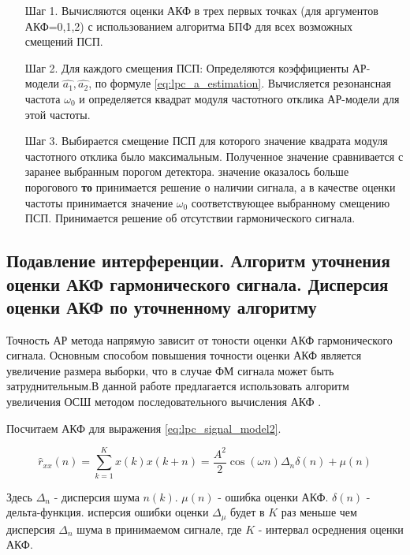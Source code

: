 \begin{itemize}
\item[Шаг 1.] Вычисляются оценки  АКФ в трех первых точках (для аргументов АКФ=0,1,2)
	с использованием алгоритма БПФ для всех возможных смещений ПСП. 
\item[Шаг 2.] Для каждого смещения ПСП: 
	Определяются коэффициенты АР-модели ${\hat{a_1}, \hat{a_2}}$, 
	по формуле \ref{eq:lpc_a_estimation}. 
	Вычисляется резонансная частота ${\omega_0}$
	и определяется квадрат модуля частотного отклика АР-модели для этой частоты. 
\item[Шаг 3.] Выбирается смещение ПСП для которого значение квадрата модуля частотного отклика было максимальным. Полученное значение сравнивается с заранее выбранным порогом детектора. 
	  значение оказалось больше порогового {\bf{то}} 
		принимается решение о наличии сигнала, а в качестве оценки
		частоты принимается значение ${\omega_0}$ соответствующее выбранному смещению ПСП. 
		Принимается решение об отсутствии гармонического сигнала.
\end{itemize}

\subsection{Подавление интерференции. Алгоритм уточнения оценки АКФ гармонического сигнала.
		Дисперсия оценки АКФ по уточненному алгоритму}
\label{ssec4:quadruple}

Точность АР метода напрямую зависит от тоности оценки АКФ гармонического сигнала. Основным способом повышения точности оценки АКФ является увеличение размера выборки,
что в случае ФМ сигнала может быть затруднительным.В данной работе предлагается использовать алгоритм увеличения ОСШ методом последовательного вычисления
АКФ \cite{ostanin_akf}.

Посчитаем АКФ для выражения \ref{eq:lpc_signal_model2}.

\begin{center}
\begin{equation}
	\label{eq:lpc_akf_n}
	\hat{r}_{xx}(n) = \sum \limits_{k=1}^{K} x(k)x(k+n) = \frac{A^2}{2} \cos{(\omega{n})} \Delta_n \delta{(n)} + \mu{(n)}
\end{equation}
\end{center}

Здесь ${\Delta_n}$ - дисперсия шума ${n(k)}$. ${\mu{(n)}}$ - ошибка оценки АКФ. ${\delta{(n)}}$ - дельта-функция. исперсия ошибки
оценки ${\Delta_{\mu}}$ будет в ${K}$ раз меньше чем дисперсия ${\Delta_n}$ шума в принимаемом сигнале, где ${K}$ - интервал
осреднения оценки АКФ.

